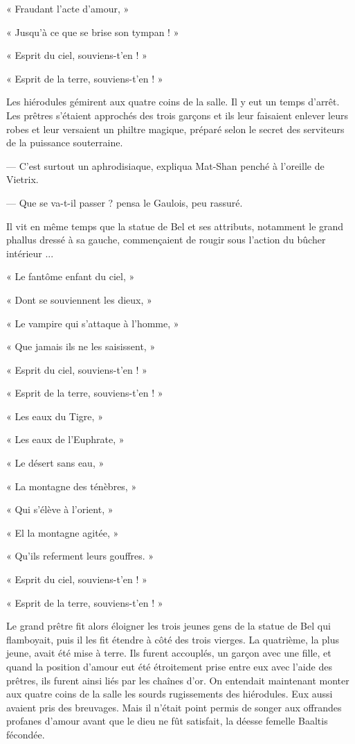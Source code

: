 \documentclass[a4paper, 11pt, oneside, polutonikogreek, french]{article}
\begin{document}
« Fraudant l'acte d'amour, »

« Jusqu'à ce que se brise son tympan ! »

« Esprit du ciel, souviens-t'en ! »

« Esprit de la terre, souviens-t'en ! »

Les hiérodules gémirent aux quatre coins de la salle. Il y eut un temps d'arrêt. Les prêtres s'étaient approchés des trois garçons et ils leur faisaient enlever leurs robes et leur versaient un philtre magique, préparé selon le secret des serviteurs de la puissance souterraine.

--- C'est surtout un aphrodisiaque, expliqua Mat-Shan penché à l'oreille de Vietrix.

--- Que se va-t-il passer ? pensa le Gaulois, peu rassuré.

Il vit en même temps que la statue de Bel et ses attributs, notamment le grand phallus dressé à sa gauche, commençaient de rougir sous l'action du bûcher intérieur ...

« Le fantôme enfant du ciel, »

« Dont se souviennent les dieux, »

« Le vampire qui s'attaque à l'homme, »

« Que jamais ils ne les saisissent, »

« Esprit du ciel, souviens-t'en ! »

« Esprit de la terre, souviens-t'en ! »

« Les eaux du Tigre, »

« Les eaux de l'Euphrate, »

« Le désert sans eau, »

« La montagne des ténèbres, »

« Qui s'élève à l'orient, »

« El la montagne agitée, »

« Qu'ils referment leurs gouffres. »

« Esprit du ciel, souviens-t'en ! »

« Esprit de la terre, souviens-t'en ! »

Le grand prêtre fit alors éloigner les trois jeunes gens de la statue de Bel qui flamboyait, puis il les fit étendre à côté des trois vierges. La quatrième, la plus jeune, avait été mise à terre. Ils furent accouplés, un garçon avec une fille, et quand la position d'amour eut été étroitement prise entre eux avec l'aide des prêtres, ils furent ainsi liés par les chaînes d'or. On entendait maintenant monter aux quatre coins de la salle les sourds rugissements des hiérodules. Eux aussi avaient pris des breuvages. Mais il n'était point permis de songer aux offrandes profanes d'amour avant que le dieu ne fût satisfait, la déesse femelle Baaltis fécondée.
\end{document}
